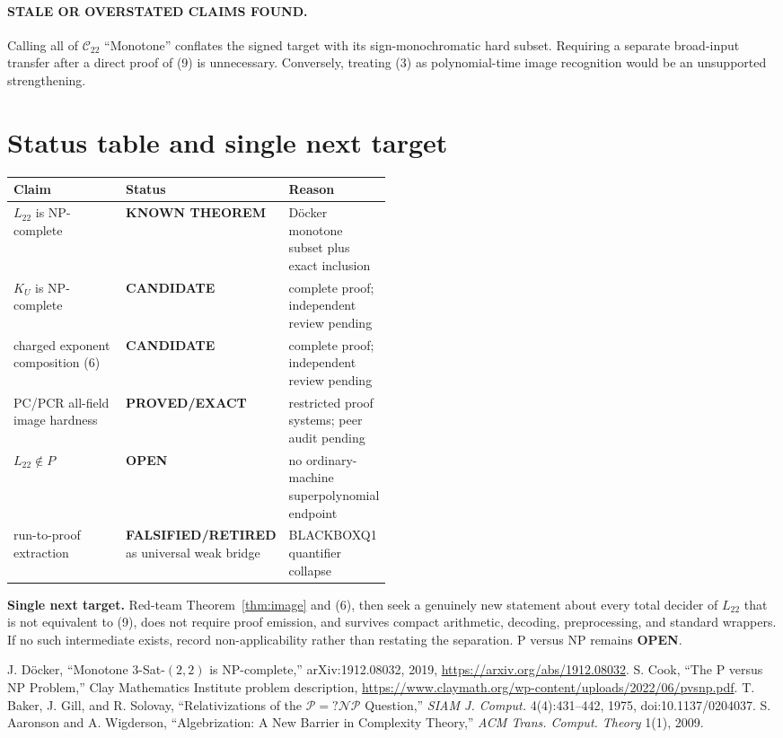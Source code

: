 \documentclass[11pt]{article}
\newcommand{\Ctwo}{\mathcal C_{22}}
\newcommand{\Ltwo}{L_{22}}
\newcommand{\OPEN}{\textbf{OPEN}}
\newcommand{\EXACT}{\textbf{PROVED/EXACT}}
\newcommand{\KNOWN}{\textbf{KNOWN THEOREM}}
\newcommand{\CAND}{\textbf{CANDIDATE}}
\newcommand{\RET}{\textbf{FALSIFIED/RETIRED}}
\begin{document}
\paragraph{STALE OR OVERSTATED CLAIMS FOUND.}
Calling all of $\Ctwo$ ``Monotone'' conflates the signed target with its
sign-monochromatic hard subset.  Requiring a separate broad-input transfer
after a direct proof of (9) is unnecessary.  Conversely, treating (3) as
polynomial-time image recognition would be an unsupported strengthening.

\section{Status table and single next target}
\begin{center}
\begin{tabularx}{0.97\linewidth}{@{}p{0.31\linewidth}p{0.18\linewidth}X@{}}
\toprule
Claim & Status & Reason\\
\midrule
$\Ltwo$ is NP-complete & \KNOWN & D\"ocker monotone subset plus exact inclusion\\
$K_U$ is NP-complete & \CAND & complete proof; independent review pending\\
charged exponent composition (6) & \CAND & complete proof; independent review pending\\
PC/PCR all-field image hardness & \EXACT & restricted proof systems; peer audit pending\\
$\Ltwo\notin P$ & \OPEN & no ordinary-machine superpolynomial endpoint\\
run-to-proof extraction & \RET{} as universal weak bridge & BLACKBOXQ1 quantifier collapse\\
\bottomrule
\end{tabularx}
\end{center}

\textbf{Single next target.}  Red-team Theorem~\ref{thm:image} and (6), then
seek a genuinely new statement about every total decider of $\Ltwo$ that is
not equivalent to (9), does not require proof emission, and survives compact
arithmetic, decoding, preprocessing, and standard wrappers.  If no such
intermediate exists, record non-applicability rather than restating the
separation.  P versus NP remains \OPEN.

\begin{thebibliography}{9}
J. D\"ocker, ``Monotone 3-Sat-$(2,2)$ is NP-complete,'' arXiv:1912.08032,
2019, \url{https://arxiv.org/abs/1912.08032}.
S. Cook, ``The P versus NP Problem,'' Clay Mathematics Institute problem
description, \url{https://www.claymath.org/wp-content/uploads/2022/06/pvsnp.pdf}.
T. Baker, J. Gill, and R. Solovay, ``Relativizations of the
$\mathcal P=?\mathcal{NP}$ Question,'' \emph{SIAM J. Comput.} 4(4):431--442,
1975, doi:10.1137/0204037.
S. Aaronson and A. Wigderson, ``Algebrization: A New Barrier in Complexity
Theory,'' \emph{ACM Trans. Comput. Theory} 1(1), 2009.
\end{thebibliography}

\end{document}
